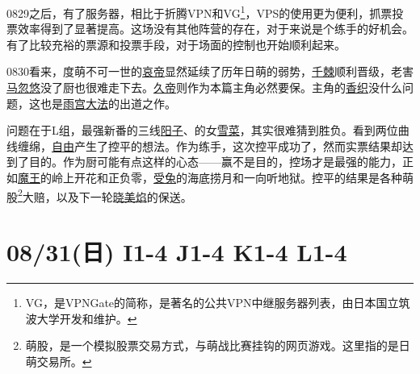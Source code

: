 0829之后，有了服务器，相比于折腾VPN和VG\footnote{VG，是VPNGate的简称，是著名的公共VPN中继服务器列表，由日本国立筑波大学开发和维护。}，VPS的使用更为便利，抓票投票效率得到了显著提高。这场没有其他阵营的存在，对于来说是个练手的好机会。有了比较充裕的票源和投票手段，对于场面的控制也开始顺利起来。

0830看来，度萌不可一世的\uline{哀帝}显然延续了历年日萌的弱势，\uline{千棘}顺利晋级，老害\uline{马忽悠}没了厨也很难走下去。\uline{久帝}则作为本篇主角必然要保。主角的\uline{香织}没什么问题，这也是\uline{雨宫大法}的出道之作。

问题在于L组，最强新番的三线\uline{阳子}、的女\uline{雪菜}，其实很难猜到胜负。看到两位曲线缠绵，\uline{自由}产生了控平的想法。作为练手，这次控平成功了，然而实票结果却达到了目的。作为厨可能有点这样的心态——赢不是目的，控场才是最强的能力，正如\uline{魔王}的岭上开花和正负零，\uline{受兔}的海底捞月和一向听地狱。控平的结果是各种萌股\footnote{萌股，是一个模拟股票交易方式，与萌战比赛挂钩的网页游戏。这里指的是{日萌交易所}。
}大赔，以及下一轮\uline{晓美焰}的保送。

\section{08/31(日) I1-4 J1-4 K1-4 L1-4}


